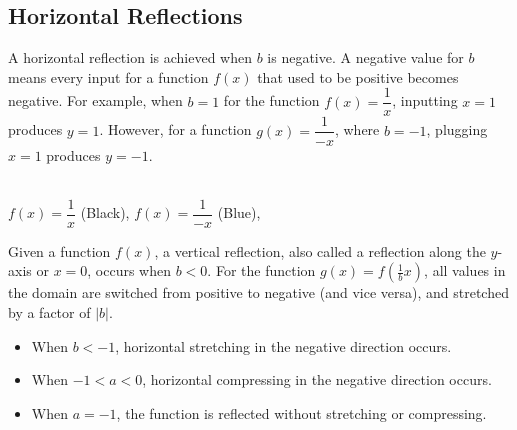 \clearpage\subsection{Horizontal Reflections}
A horizontal reflection is achieved when $b$ is negative. A negative value for $b$ means every input for a function $f(x)$ that used to be positive becomes negative. For example, when $b = 1$ for the function $f(x) = \dfrac{1}{x}$, inputting $x = 1$ produces $y = 1$. However, for a function $g(x) = \dfrac{1}{-x}$, where $b = -1$, plugging $x = 1$ produces $y = -1$.
\begin{center}\vspace{-0.25cm}
    \\
    $f(x) = \dfrac{1}{x}$ (Black), 
    $f(x) = \dfrac{1}{-x}$ (Blue),
\end{center}

\begin{definition}
    Given a function $f(x)$, a vertical reflection, also called a reflection along the $y$-axis or $x = 0$, occurs when $b < 0$. For the function $\displaystyle g(x) = f\left(\frac{1}{b}x \right)$, all values in the domain are switched from positive to negative (and vice versa), and stretched by a factor of $\left|b\right|$.
    \begin{itemize}
        \item When $b < -1$, horizontal stretching in the negative direction occurs.
        \item When $-1 < a < 0$, horizontal compressing in the negative direction occurs.
        \item When $a = -1$, the function is reflected without stretching or compressing.
    \end{itemize}
\end{definition}